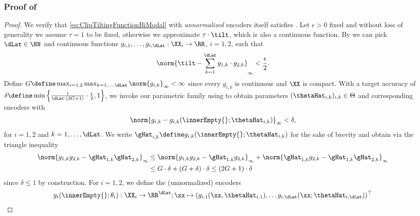 \documentclass{article}
\begin{document}
\subsubsection{Proof of }
\label{lem:DensityClipUnnormalizedEncoders-PROOF}
\begin{proof}
 We verify that \eqref{eq:ClipTiltingFunctionBiModal} with
 \emph{unnormalized} encoders itself satisfies
 .
 Let $\epsilon > 0$ fixed and without loss of
 generality we assume $\tau = 1$ to be fixed, otherwise we approximate $\tau
  \cdot \tilt$, which is also a continuous function. By
  we can pick $\dLat\in
  \NN$ and continuous functions $g_{i,1}, \ldots, g_{i,\dLat}:\XX_i \to \RR$,
 $i=1,2$, such that
 \begin{align*}
  \norm{\tilt - \sum_{k=1}^{\dLat} g_{1,k}\cdot g_{2,k}}_{\infty} < \frac{\epsilon}{2}.
 \end{align*}
 Define $G \define \max_{i=1,2} \max_{k=1,\ldots, \dLat} \norm{g_{i,k}}_{\infty} < \infty$
 since every $g_{i,k}$ is continuous and $\XX$ is compact.
 With a target accuracy of $\delta \define \min\left\{ \frac{1}{\dLat \cdot (2G + 1)}
  \cdot \frac{\epsilon}{2}, 1\right\}$,
 we invoke our parametric family using 
 to obtain parameters $(\thetaHat_{i,k})_{i,k} \in \Theta$ and corresponding
 encoders with
 \begin{align*}
  \norm{g_{i,k} - g_{i,k}(\innerEmpty{};\thetaHat_{i,k})}_{\infty} < \delta,
 \end{align*}
 for $i=1,2$ and $k=1,\ldots, \dLat$. We write
 $\gHat_{i,k} \define g_{i,k}(\innerEmpty{};\thetaHat_{i,k})$ for the sake of brevity
 and obtain via the triangle inequality
 \begin{align*}
  \norm{g_{1,k}g_{2,k} - \gHat_{1,k}\gHat_{2,k}}_{\infty}
   & \leq
  \norm{g_{1,k}g_{2,k} - \gHat_{1,k}g_{2,k}}_{\infty}
  + \norm{\gHat_{1,k}g_{2,k} - \gHat_{1,k}\gHat_{2,k}}_{\infty} \\
   & \leq G \cdot \delta + (G + \delta) \cdot \delta
  \leq (2G+1) \cdot \delta
 \end{align*}
 since $\delta \leq 1$ by construction. For $i=1,2$, we define the (unnormalized) encoders
 \begin{align*}
  g_i(\innerEmpty{};\theta_i) : \XX_i \to \RR^{\dLat};
  \xx \mapsto (g_{i, 1}(\xx, \thetaHat_{i,1}), \ldots g_{i,\dLat}(\xx;\thetaHat_{i,\dLat}))^\top
 \end{align*}

\end{proof}
\end{document}
